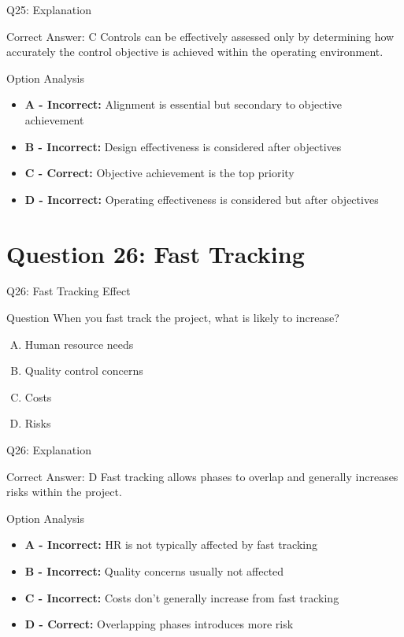 \documentclass{beamer}
\begin{document}
	\begin{frame}{Q25: Explanation}
		\begin{block}{Correct Answer: C}
			Controls can be effectively assessed only by determining how accurately the control objective is achieved within the operating environment.
		\end{block}
		\begin{block}{Option Analysis}
			\begin{itemize}
				\item \textbf{A - Incorrect:} Alignment is essential but secondary to objective achievement
				\item \textbf{B - Incorrect:} Design effectiveness is considered after objectives
				\item \textbf{C - Correct:} Objective achievement is the top priority
				\item \textbf{D - Incorrect:} Operating effectiveness is considered but after objectives
			\end{itemize}
		\end{block}
	\end{frame}
	
	\section{Question 26: Fast Tracking}
	
	\begin{frame}{Q26: Fast Tracking Effect}
		\begin{block}{Question}
			When you fast track the project, what is likely to increase?
		\end{block}
		\begin{enumerate}[(A)]
			\item Human resource needs
			\item Quality control concerns
			\item Costs
			\item Risks
		\end{enumerate}
	\end{frame}
	
	\begin{frame}{Q26: Explanation}
		\begin{block}{Correct Answer: D}
			Fast tracking allows phases to overlap and generally increases risks within the project.
		\end{block}
		\begin{block}{Option Analysis}
			\begin{itemize}
				\item \textbf{A - Incorrect:} HR is not typically affected by fast tracking
				\item \textbf{B - Incorrect:} Quality concerns usually not affected
				\item \textbf{C - Incorrect:} Costs don't generally increase from fast tracking
				\item \textbf{D - Correct:} Overlapping phases introduces more risk
			\end{itemize}
		\end{block}
	\end{frame}
	
\end{document}
